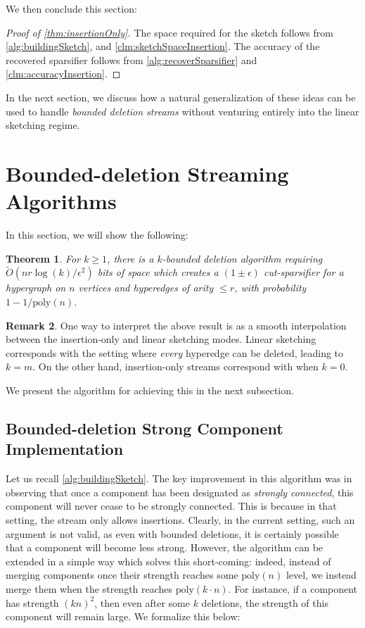 \documentclass[11pt]{article}
\newtheorem{theorem}{Theorem}[section]
\theoremstyle{definition}
\newtheorem{remark}[theorem]{Remark}
\newcommand{\eps}{\epsilon}
\begin{document}
We then conclude this section:

\begin{proof}[Proof of \cref{thm:insertionOnly}]
The space required for the sketch follows from \cref{alg:buildingSketch}, and \cref{clm:sketchSpaceInsertion}. The accuracy of the recovered sparsifier follows from \cref{alg:recoverSparsifier} and \cref{clm:accuracyInsertion}.
\end{proof}

In the next section, we discuss how a natural generalization of these ideas can be used to handle \emph{bounded deletion streams} without venturing entirely into the linear sketching regime.

\section{Bounded-deletion Streaming Algorithms}\label{sec:booundedDeletion}

In this section, we will show the following:

\begin{theorem}\label{thm:boundedDeletion}
	For $k \geq 1$, there is a $k$-bounded deletion algorithm requiring $\widetilde{O}(n r \log(k) / \eps^2)$ bits of space which creates a $(1 \pm \eps)$ cut-sparsifier for a hypergraph on $n$ vertices and hyperedges of arity $\leq r$, with probability $1 - 1 / \mathrm{poly}(n)$.
\end{theorem}

\begin{remark}
	One way to interpret the above result is as a smooth interpolation between the insertion-only and linear sketching modes. Linear sketching corresponds with the setting where \emph{every} hyperedge can be deleted, leading to $k = m$. On the other hand, insertion-only streams correspond with when $k = 0$.
\end{remark}

We present the algorithm for achieving this in the next subsection.

\subsection{Bounded-deletion Strong Component Implementation}

Let us recall \cref{alg:buildingSketch}. The key improvement in this algorithm was in observing that once a component has been designated as \emph{strongly connected}, this component will never cease to be strongly connected. This is because in that setting, the stream only allows insertions. Clearly, in the current setting, such an argument is not valid, as even with bounded deletions, it is certainly possible that a component will become less strong. However, the algorithm can be extended in a simple way which solves this short-coming: indeed, instead of merging components once their strength reaches some $\mathrm{poly}(n)$ level, we instead merge them when the strength reaches $\mathrm{poly}(k \cdot n)$. For instance, if a component has strength $(kn)^2$, then even after some $k$ deletions, the strength of this component will remain large. We formalize this below:
\end{document}
